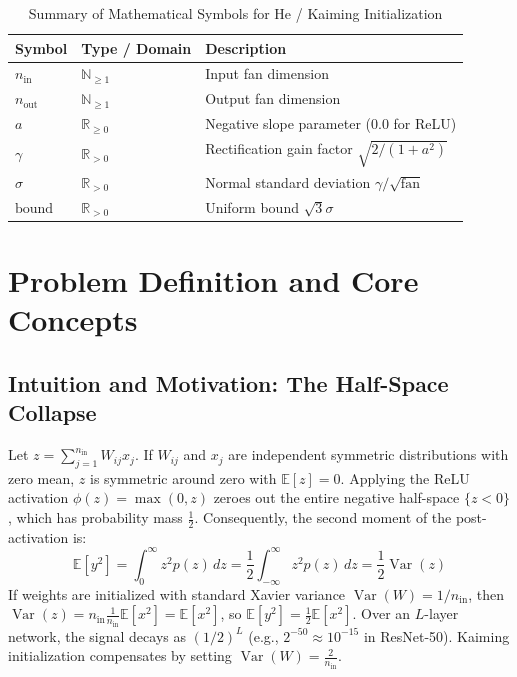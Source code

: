 \documentclass[11pt,a4paper]{article}
\theoremstyle{definition}
\begin{document}
\begin{table}[h]
\centering
\caption{Summary of Mathematical Symbols for He / Kaiming Initialization}
\begin{tabular}{lll}
\toprule
\textbf{Symbol} & \textbf{Type / Domain} & \textbf{Description} \\
\midrule
$n_{\text{in}}$ & $\mathbb{N}_{\ge 1}$ & Input fan dimension \\
$n_{\text{out}}$ & $\mathbb{N}_{\ge 1}$ & Output fan dimension \\
$a$ & $\mathbb{R}_{\ge 0}$ & Negative slope parameter ($0.0$ for ReLU) \\
$\gamma$ & $\mathbb{R}_{> 0}$ & Rectification gain factor $\sqrt{2 / (1 + a^2)}$ \\
$\sigma$ & $\mathbb{R}_{> 0}$ & Normal standard deviation $\gamma / \sqrt{\text{fan}}$ \\
$\text{bound}$ & $\mathbb{R}_{> 0}$ & Uniform bound $\sqrt{3} \sigma$ \\
\bottomrule
\end{tabular}
\end{table}

\section{Problem Definition and Core Concepts}

\subsection{Intuition and Motivation: The Half-Space Collapse}
Let $z = \sum_{j=1}^{n_{\text{in}}} W_{ij} x_j$. If $W_{ij}$ and $x_j$ are independent symmetric distributions with zero mean, $z$ is symmetric around zero with $\mathbb{E}[z] = 0$. Applying the ReLU activation $\phi(z) = \max(0, z)$ zeroes out the entire negative half-space $\{z < 0\}$, which has probability mass $\frac{1}{2}$. Consequently, the second moment of the post-activation is:
\begin{equation}
\mathbb{E}[y^2] = \int_0^\infty z^2 p(z) \, dz = \frac{1}{2} \int_{-\infty}^\infty z^2 p(z) \, dz = \frac{1}{2} \operatorname{Var}(z)
\end{equation}
If weights are initialized with standard Xavier variance $\operatorname{Var}(W) = 1 / n_{\text{in}}$, then $\operatorname{Var}(z) = n_{\text{in}} \frac{1}{n_{\text{in}}} \mathbb{E}[x^2] = \mathbb{E}[x^2]$, so $\mathbb{E}[y^2] = \frac{1}{2} \mathbb{E}[x^2]$. Over an $L$-layer network, the signal decays as $(1/2)^L$ (e.g., $2^{-50} \approx 10^{-15}$ in ResNet-50). Kaiming initialization compensates by setting $\operatorname{Var}(W) = \frac{2}{n_{\text{in}}}$.
\end{document}
